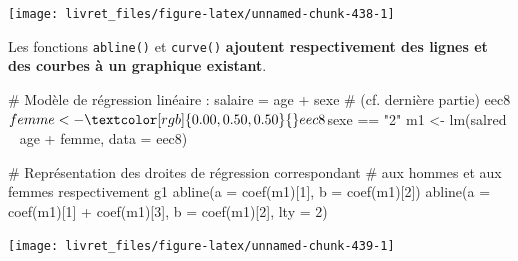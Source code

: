 \documentclass[12pt,twosided, notitlepage]{book}
\newenvironment{Shaded}{}{}
\newcommand{\KeywordTok}[1]{\textcolor[rgb]{0.00,0.00,1.00}{#1}}
\newcommand{\DataTypeTok}[1]{#1}
\newcommand{\DecValTok}[1]{#1}
\newcommand{\StringTok}[1]{\textcolor[rgb]{0.00,0.50,0.50}{#1}}
\newcommand{\CommentTok}[1]{\textcolor[rgb]{0.00,0.50,0.00}{#1}}
\newcommand{\OperatorTok}[1]{#1}
\newcommand{\NormalTok}[1]{#1}
\renewenvironment{Shaded}{\begin{snugshade}}{\end{snugshade}}
\begin{document}
\begin{center}\texttt{[image: livret\_files/figure-latex/unnamed-chunk-438-1]} \end{center}

Les fonctions \texttt{abline()} et
\texttt{curve()} \textbf{ajoutent
respectivement des lignes et des courbes à un graphique existant}.

\begin{Shaded}
\begin{Highlighting}[]
\CommentTok{# Modèle de régression linéaire : salaire = age + sexe}
\CommentTok{# (cf. dernière partie)}
\NormalTok{eec8}\OperatorTok{$}\NormalTok{femme <-}\StringTok{ }\NormalTok{eec8}\OperatorTok{$}\NormalTok{sexe }\OperatorTok{==}\StringTok{ "2"}
\NormalTok{m1 <-}\StringTok{ }\KeywordTok{lm}\NormalTok{(salred }\OperatorTok{~}\StringTok{ }\NormalTok{age }\OperatorTok{+}\StringTok{ }\NormalTok{femme, }\DataTypeTok{data =}\NormalTok{ eec8)}

\CommentTok{# Représentation des droites de régression correspondant}
\CommentTok{# aux hommes et aux femmes respectivement}
\NormalTok{g1}
\KeywordTok{abline}\NormalTok{(}\DataTypeTok{a =} \KeywordTok{coef}\NormalTok{(m1)[}\DecValTok{1}\NormalTok{], }\DataTypeTok{b =} \KeywordTok{coef}\NormalTok{(m1)[}\DecValTok{2}\NormalTok{])}
\KeywordTok{abline}\NormalTok{(}\DataTypeTok{a =} \KeywordTok{coef}\NormalTok{(m1)[}\DecValTok{1}\NormalTok{] }\OperatorTok{+}\StringTok{ }\KeywordTok{coef}\NormalTok{(m1)[}\DecValTok{3}\NormalTok{], }\DataTypeTok{b =} \KeywordTok{coef}\NormalTok{(m1)[}\DecValTok{2}\NormalTok{], }\DataTypeTok{lty =} \DecValTok{2}\NormalTok{)}
\end{Highlighting}
\end{Shaded}

\begin{center}\texttt{[image: livret\_files/figure-latex/unnamed-chunk-439-1]} \end{center}
\end{document}
